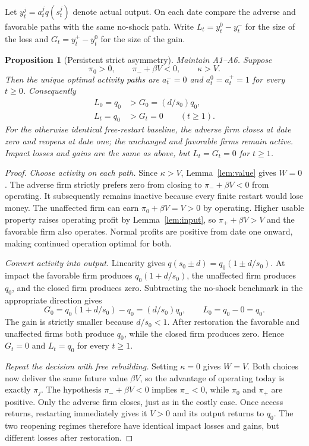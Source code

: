 \documentclass[11pt,letterpaper]{article}
\newtheorem{proposition}{Proposition}
\begin{document}
Let $y_t^j=a_t^jq(s_t^j)$ denote actual output. On each date compare the adverse and favorable paths with the same no-shock path. Write $L_t=y_t^0-y_t^-$ for the size of the loss and $G_t=y_t^+-y_t^0$ for the size of the gain.
\begin{proposition}[Persistent strict asymmetry]\label{prop:main}
Maintain A1--A6. Suppose
\begin{equation}\label{eq:conditions}
\pi_0>0,\qquad \pi_-+\beta V<0,\qquad \kappa>V.
\end{equation}
Then the unique optimal activity paths are $a_t^-=0$ and $a_t^0=a_t^+=1$ for every $t\geq0$. Consequently
\begin{align}
L_0=q_0&>G_0=(d/s_0)q_0,\\
L_t=q_0&>G_t=0\qquad(t\geq1).
\end{align}
For the otherwise identical free-restart baseline, the adverse firm closes at date zero and reopens at date one; the unchanged and favorable firms remain active. Impact losses and gains are the same as above, but $L_t=G_t=0$ for $t\geq1$.
\end{proposition}
\begin{proof}
\emph{Choose activity on each path.} Since $\kappa>V$, Lemma~\ref{lem:value} gives $W=0$. The adverse firm strictly prefers zero from closing to $\pi_-+\beta V<0$ from operating. It subsequently remains inactive because every finite restart would lose money. The unaffected firm can earn $\pi_0+\beta V=V>0$ by operating. Higher usable property raises operating profit by Lemma~\ref{lem:input}, so $\pi_++\beta V>V$ and the favorable firm also operates. Normal profits are positive from date one onward, making continued operation optimal for both.

\emph{Convert activity into output.} Linearity gives $q(s_0\pm d)=q_0(1\pm d/s_0)$. At impact the favorable firm produces $q_0(1+d/s_0)$, the unaffected firm produces $q_0$, and the closed firm produces zero. Subtracting the no-shock benchmark in the appropriate direction gives
\[
 G_0=q_0(1+d/s_0)-q_0=(d/s_0)q_0,\qquad L_0=q_0-0=q_0.
\]
The gain is strictly smaller because $d/s_0<1$. After restoration the favorable and unaffected firms both produce $q_0$, while the closed firm produces zero. Hence $G_t=0$ and $L_t=q_0$ for every $t\geq1$.

\emph{Repeat the decision with free rebuilding.} Setting $\kappa=0$ gives $W=V$. Both choices now deliver the same future value $\beta V$, so the advantage of operating today is exactly $\pi_j$. The hypothesis $\pi_-+\beta V<0$ implies $\pi_-<0$, while $\pi_0$ and $\pi_+$ are positive. Only the adverse firm closes, just as in the costly case. Once access returns, restarting immediately gives it $V>0$ and its output returns to $q_0$. The two reopening regimes therefore have identical impact losses and gains, but different losses after restoration.
\end{proof}
\end{document}
